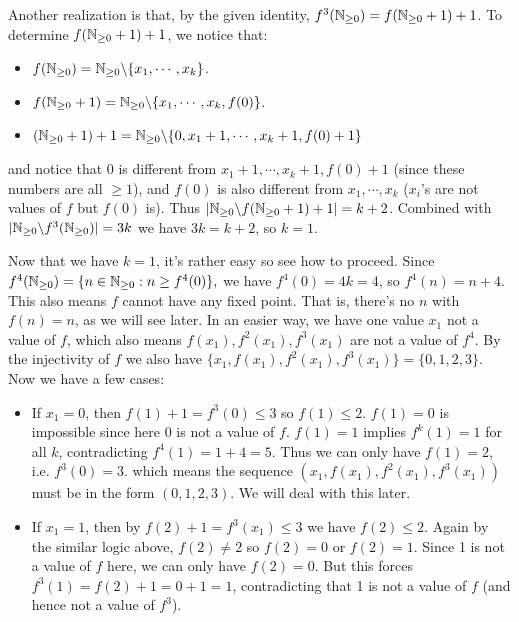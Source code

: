 \documentclass[11pt,a4paper]{article}
\begin{document}
\begin{enumerate}
	Another realization is that, by the given identity, $f^3(\mathbb{N}_{\ge 0})=f(\mathbb{N}_{\ge 0} +1 )+1$. 
	To determine $f(\mathbb{N}_{\ge 0} +1 )+1$, we notice that: 
	\begin{itemize}
		\item $f(\mathbb{N}_{\ge 0}) = \mathbb{N}_{\ge 0}\backslash \{x_1, \cdots , x_k\}$. 
		
		\item $f(\mathbb{N}_{\ge 0} +1) = \mathbb{N}_{\ge 0}\backslash \{x_1, \cdots , x_k, f(0)\}$. 
		
		\item $(\mathbb{N}_{\ge 0} +1)+1 = \mathbb{N}_{\ge 0}\backslash \{0, x_1+1, \cdots , x_k+1, f(0)+1\}$
	\end{itemize}
    and notice that $0$ is different from $x_1+1, \cdots , x_k+1, f(0)+1$ (since these numbers are all $\ge 1$), and $f(0)$ is also different from $x_1, \cdots , x_k$ ($x_i$'s are not values of $f$ but $f(0)$ is). 
    Thus $|\mathbb{N}_{\ge 0}\backslash f(\mathbb{N}_{\ge 0} +1 )+1| = k + 2$. Combined with $|\mathbb{N}_{\ge 0}\backslash f^3(\mathbb{N}_{\ge 0})| = 3k$ we have $3k=k+2$, so $k=1$. 
    
    Now that we have $k=1$, it's rather easy so see how to proceed. Since $f^4(\mathbb{N}_{\ge 0})=\{n\in \mathbb{N}_{\ge 0}: n\ge f^4(0)\},$ we have $f^4(0)=4k=4$, so $f^4(n)=n+4$. This also means $f$ cannot have any fixed point. That is, there's no $n$ with $f(n)=n$, as we will see later. 
    In an easier way, we have one value $x_1$ not a value of $f$, which also means $f(x_1), f^2(x_1), f^3(x_1)$ are not a value of $f^4$. 
    By the injectivity of $f$ we also have $\{x_1, f(x_1), f^2(x_1), f^3(x_1)\}=\{0, 1, 2, 3\}$. Now we have a few cases: 
    \begin{itemize}
    	\item If $x_1=0$, then $f(1)+1=f^3(0)\le 3$ so $f(1)\le 2$. $f(1)=0$ is impossible since here $0$ is not a value of $f$. $f(1)=1$ implies $f^k(1)=1$ for all $k$, contradicting $f^4(1)=1+4=5$. 
    	Thus we can only have $f(1)=2$, i.e. $f^3(0)=3$.  which means the sequence $(x_1, f(x_1), f^2(x_1), f^3(x_1))$ must be in the form $(0, 1, 2, 3)$. We will deal with this later. 
    	
    	\item If $x_1=1$, then by $f(2)+1=f^3(x_1)\le 3$ we have $f(2)\le 2$. Again by the similar logic above, $f(2)\neq 2$ so $f(2)=0$ or $f(2)=1$. Since 1 is not a value of $f$ here, we can only have $f(2)=0$. 
    	But this forces $f^3(1)=f(2)+1=0+1=1$, contradicting that 1 is not a value of $f$ (and hence not a value of $f^3$). 
    	

\end{itemize}
\end{enumerate}
\end{document}

